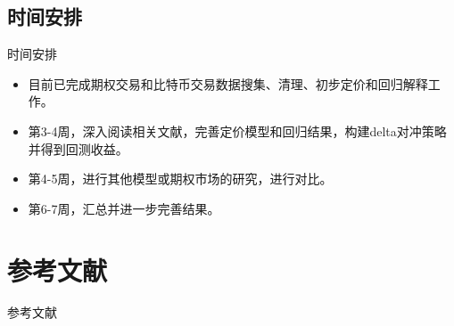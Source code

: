 \documentclass[11pt,dark]{mathbeamer}
\begin{document}
\subsection{时间安排}
\begin{frame}{时间安排}
  \begin{itemize}
    \item 目前已完成期权交易和比特币交易数据搜集、清理、初步定价和回归解释工作。
    \item 第3-4周，深入阅读相关文献，完善定价模型和回归结果，构建delta对冲策略并得到回测收益。
    \item 第4-5周，进行其他模型或期权市场的研究，进行对比。
    \item 第6-7周，汇总并进一步完善结果。
  \end{itemize}
\end{frame}

\section*{参考文献}
    \begin{frame}{参考文献}
        
		
	\end{frame}
\end{document}
